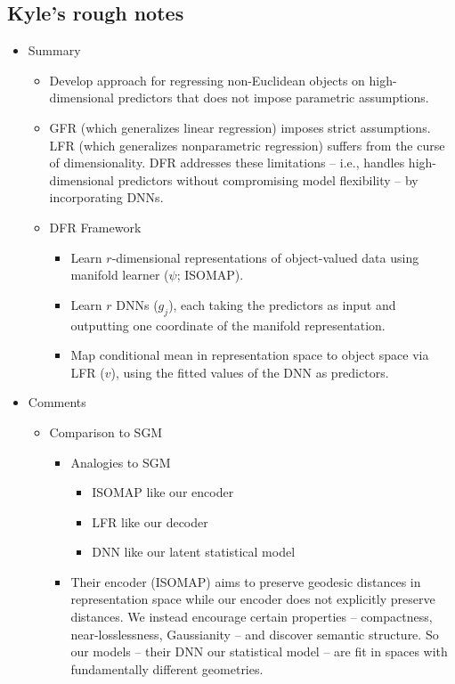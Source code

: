 \subsection*{Kyle's rough notes}

\begin{itemize}

    \item Summary
    \begin{itemize}
        \item Develop approach for regressing non-Euclidean objects on high-dimensional predictors that does not impose parametric assumptions. 
        \item GFR (which generalizes linear regression) imposes strict assumptions. LFR (which generalizes nonparametric regression) suffers from the curse of dimensionality. DFR addresses these limitations -- i.e., handles high-dimensional predictors without compromising model flexibility -- by incorporating DNNs. 
        \item DFR Framework
        \begin{itemize}
            \item Learn $r$-dimensional representations of object-valued data using manifold learner ($\psi$; ISOMAP).
            \item Learn $r$ DNNs ($g_j$), each taking the predictors as input and outputting one coordinate of the manifold representation.
            \item Map conditional mean in representation space to object space via LFR ($v$), using the fitted values of the DNN as predictors. 
        \end{itemize}
    \end{itemize}

    \item Comments
    \begin{itemize}
    
        \item Comparison to SGM
        \begin{itemize}
            \item Analogies to SGM 
            \begin{itemize}
                \item ISOMAP like our encoder
                \item LFR like our decoder
                \item DNN like our latent statistical model
            \end{itemize}
            \item Their encoder (ISOMAP) aims to preserve geodesic distances in representation space while our encoder does not explicitly preserve distances. We instead encourage certain properties -- compactness, near-losslessness, Gaussianity -- and discover semantic structure.  So our models -- their DNN our statistical model -- are fit in spaces with fundamentally different geometries.  
        \end{itemize}


\end{itemize}
\end{itemize}
